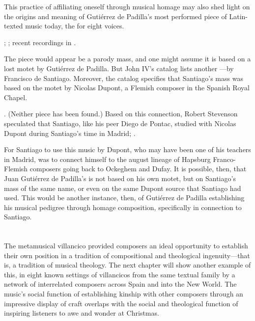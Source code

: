 This practice of affiliating oneself through musical homage may also shed light
on the origins and meaning of Gutiérrez de Padilla's most performed piece of
Latin-texted music today, the  for eight
voices.%
\begin{Footnote}
    ; \autocite{Padilla:MissaEgoFlosCampi}; recent
    recordings in \autocites{Mauleon:PadillaPalafox}{Skidmore:NewWorldCD}.
\end{Footnote}
The piece would appear be a parody mass, and one might assume it is based on a
lost motet  by Gutiérrez de Padilla.
But John IV's catalog lists another ---by Francisco de Santiago.
Moreover, the catalog specifies that Santiago's mass was based on the motet
 by Nicolas Dupont, a Flemish composer in the Spanish
Royal Chapel.%
\begin{Footnote}
    \Autocites
    [417, caixão 34, : ] {JohnIV:Catalog}
    [381, caixão 32, : .]
    {JohnIV:Catalog}.
    (Neither piece has been found.)
    Based on this connection, Robert Stevenson speculated that Santiago, like his
    peer Diego de Pontac, studied with Nicolas Dupont during Santiago's time in
    Madrid; \autocite{Stevenson:SantiagoF}.
\end{Footnote}
For Santiago to use this music by Dupont, who may have been one of his teachers
in Madrid, was to connect himself to the august lineage of Hapsburg
Franco-Flemish composers going back to Ockeghem and Dufay.
It is possible, then, that Juan Gutiérrez de Padilla's  is not based on his own motet, but on Santiago's mass of the same
name, or even on the same Dupont source that Santiago had used.
This would be another instance, then, of Gutiérrez de Padilla establishing his
musical pedigree through homage composition, specifically in connection to
Santiago.

\section{}

The metamusical villancico provided composers an ideal opportunity to establish
their own position in a tradition of compositional and theological
ingenuity---that is, a tradition of musical theology.
The next chapter will show another example of this, in eight known settings of
villancicos from the same textual family by a network of interrelated composers
across Spain and into the New World.
The music's social function of establishing kinship with other composers through
an impressive display of craft overlaps with the social and theological function
of inspiring listeners to awe and wonder at Christmas.

